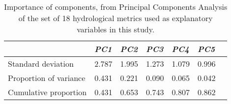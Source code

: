 \documentclass[openright,12pt,a4paper]{memoir}
\begin{document}
\doublespacing


\begin{table}[ht]
\tiny
\centering
\caption[PCA of hydrological variables/]{Importance of components, from Principal Components Analysis of the set of 18 hydrological metrics used as explanatory variables in this study.}
\label{Ch4sup_T1}
\begin{tabu} to 
\hline
                       &  \textit{PC1}   & \textit{PC2}   & \textit{PC3}   & \textit{PC4}   & \textit{PC5}  \\ \hline
Standard deviation     & 2.787 & 1.995 & 1.273 & 1.079 & 0.996 \\
Proportion of variance & 0.431 & 0.221 & 0.090 & 0.065 & 0.042 \\
Cumulative proportion  & 0.431 & 0.653 & 0.743 & 0.807 & 0.862 \\ \hline
\end{tabu}
\end{table}
\end{document}

